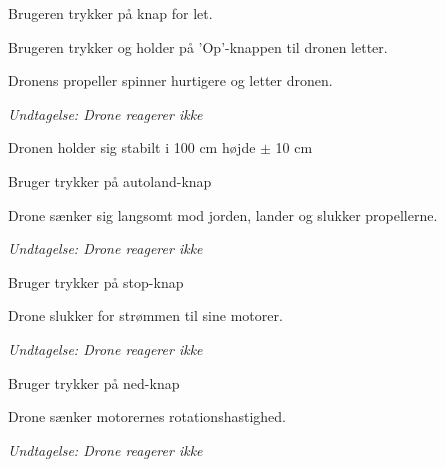 \documentclass[Main]{subfiles}
\begin{document}
\begin{UseCase}

	\begin{normFor}
	\item Brugeren trykker på knap for let.
	\item Brugeren trykker og holder på 'Op'-knappen til dronen letter.
	\item Dronens propeller spinner hurtigere og letter dronen.
	\item[] \textit{Undtagelse: Drone reagerer ikke}
	\item Dronen holder sig stabilt i 100 cm højde $\pm$ 10 cm 
	\end{normFor} 
	
	\begin{normFor}
	\item Bruger trykker på autoland-knap
	\item Drone sænker sig langsomt mod jorden, lander og slukker propellerne.
	\item[] \textit{Undtagelse: Drone reagerer ikke}
	\end{normFor} 
	
	\begin{normFor}
	\item Bruger trykker på stop-knap
	\item Drone slukker for strømmen til sine motorer.
	\item[] \textit{Undtagelse: Drone reagerer ikke}
	\end{normFor} 
	
	\begin{normFor}
	\item Bruger trykker på ned-knap
	\item Drone sænker motorernes rotationshastighed.
	\item[] \textit{Undtagelse: Drone reagerer ikke}
	\end{normFor} 
	

\end{UseCase}
\end{document}
